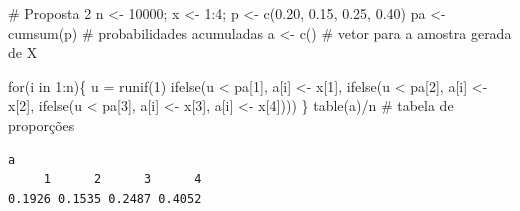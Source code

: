 \documentclass[
  letterpaper,
  DIV=11,
  numbers=noendperiod]{scrreprt}
\newenvironment{Shaded}{\begin{snugshade}}{\end{snugshade}}
\newcommand{\CommentTok}[1]{\textcolor[rgb]{0.37,0.37,0.37}{#1}}
\newcommand{\ControlFlowTok}[1]{\textcolor[rgb]{0.00,0.23,0.31}{#1}}
\newcommand{\DecValTok}[1]{\textcolor[rgb]{0.68,0.00,0.00}{#1}}
\newcommand{\FloatTok}[1]{\textcolor[rgb]{0.68,0.00,0.00}{#1}}
\newcommand{\FunctionTok}[1]{\textcolor[rgb]{0.28,0.35,0.67}{#1}}
\newcommand{\NormalTok}[1]{\textcolor[rgb]{0.00,0.23,0.31}{#1}}
\newcommand{\OtherTok}[1]{\textcolor[rgb]{0.00,0.23,0.31}{#1}}
\newcommand{\SpecialCharTok}[1]{\textcolor[rgb]{0.37,0.37,0.37}{#1}}
\begin{document}
\begin{Shaded}
\begin{Highlighting}[]
\CommentTok{\# Proposta 2}
\NormalTok{n }\OtherTok{\textless{}{-}} \DecValTok{10000}\NormalTok{; }
\NormalTok{x }\OtherTok{\textless{}{-}} \DecValTok{1}\SpecialCharTok{:}\DecValTok{4}\NormalTok{; }
\NormalTok{p }\OtherTok{\textless{}{-}} \FunctionTok{c}\NormalTok{(}\FloatTok{0.20}\NormalTok{, }\FloatTok{0.15}\NormalTok{, }\FloatTok{0.25}\NormalTok{, }\FloatTok{0.40}\NormalTok{)}
\NormalTok{pa }\OtherTok{\textless{}{-}} \FunctionTok{cumsum}\NormalTok{(p) }\CommentTok{\# probabilidades acumuladas}
\NormalTok{a  }\OtherTok{\textless{}{-}} \FunctionTok{c}\NormalTok{() }\CommentTok{\# vetor para a amostra gerada de X}
        
\ControlFlowTok{for}\NormalTok{(i }\ControlFlowTok{in} \DecValTok{1}\SpecialCharTok{:}\NormalTok{n)\{}
\NormalTok{  u }\OtherTok{=} \FunctionTok{runif}\NormalTok{(}\DecValTok{1}\NormalTok{)}
  \FunctionTok{ifelse}\NormalTok{(u }\SpecialCharTok{\textless{}}\NormalTok{ pa[}\DecValTok{1}\NormalTok{], a[i] }\OtherTok{\textless{}{-}}\NormalTok{ x[}\DecValTok{1}\NormalTok{], }
    \FunctionTok{ifelse}\NormalTok{(u }\SpecialCharTok{\textless{}}\NormalTok{ pa[}\DecValTok{2}\NormalTok{], a[i] }\OtherTok{\textless{}{-}}\NormalTok{ x[}\DecValTok{2}\NormalTok{],}
      \FunctionTok{ifelse}\NormalTok{(u }\SpecialCharTok{\textless{}}\NormalTok{ pa[}\DecValTok{3}\NormalTok{], a[i] }\OtherTok{\textless{}{-}}\NormalTok{ x[}\DecValTok{3}\NormalTok{], a[i] }\OtherTok{\textless{}{-}}\NormalTok{ x[}\DecValTok{4}\NormalTok{])))}
\NormalTok{\}}
\FunctionTok{table}\NormalTok{(a)}\SpecialCharTok{/}\NormalTok{n }\CommentTok{\# tabela de proporções}
\end{Highlighting}
\end{Shaded}

\begin{verbatim}
a
     1      2      3      4 
0.1926 0.1535 0.2487 0.4052 
\end{verbatim}
\end{document}
